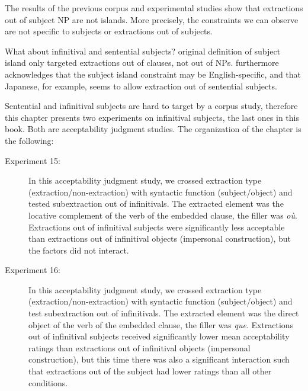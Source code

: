 \label{ch:exp-infinitival}

The results of the previous corpus and experimental studies show that extractions out of subject NP are not islands. More precisely, the constraints we can observe are not specific to subjects or extractions out of subjects.

What about infinitival and sentential subjects?  original definition of subject island only targeted extractions out of clauses, not out of NPs. \citet{Ross.1967} furthermore acknowledges that the subject island constraint may be English-specific, and that Japanese, for example, seems to allow extraction out of sentential subjects.

Sentential and infinitival subjects are hard to target by a corpus study, therefore this chapter presents two experiments on infinitival subjects, the last ones in this book. Both are acceptability judgment studies. The organization of the chapter is the following:

\begin{description}

\item[Experiment 15:] In this acceptability judgment study, we crossed extraction type (extraction\slash non-extraction) with syntactic function (subject\slash object) and tested subextraction out of infinitivals. The extracted element was the locative complement of the verb of the embedded clause, the filler was  \emph{où}. Extractions out of infinitival subjects were significantly less acceptable than extractions out of infinitival objects (impersonal construction), but the factors did not interact.

\item[Experiment 16:] In this acceptability judgment study, we crossed extraction type (extraction\slash non-extraction) with syntactic function (subject\slash object) and test subextraction out of infinitivals. The extracted element was the direct object of the verb of the embedded clause, the filler was \emph{que}. Extractions out of infinitival subjects received significantly lower mean acceptability ratings than extractions out of infinitival objects (impersonal construction), but this time there was also a significant interaction such that extractions out of the subject had lower ratings than all other conditions.

\end{description}
